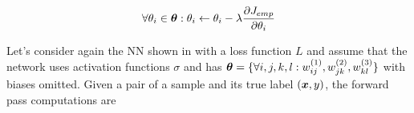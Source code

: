 
%


%


\begin{align}
 \forall \theta_i \in \boldsymbol{\theta} : \theta_i \leftarrow \theta_i - \lambda  \frac{\partial J_{emp} }{\partial \theta_i}
\label{eq:gradient_update}
\end{align}

 Let's 
consider again the NN shown in \addfigure{\ref{fig:nn_typical_structure}} with a loss function $L$ and assume that the network uses activation functions $\sigma$ and has $\boldsymbol{\theta} = \{ \forall i,j,k,l : w^{(1)}_{ij}, w^{(2)}_{jk}, w^{(3)}_{kl}  \}$ with biases omitted. Given a pair of a sample and its true label $(\boldsymbol{x}, y)$, the forward pass computations are

